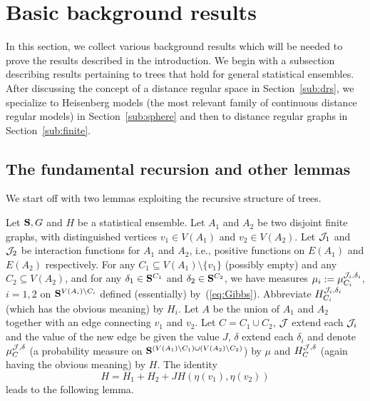 \setcounter{equation}{0}

\section{Basic background results} \label{sec:prelims}
In this section, we collect various background results which
will be needed to prove the results described in the introduction.
We begin with a subsection describing results pertaining to trees that 
hold for general statistical ensembles. 
After discussing the concept of a distance
regular space in Section~\ref{sub:drs}, we specialize 
to Heisenberg models (the most relevant family of continuous distance 
regular models) in Section~\ref{sub:sphere}
and then to distance regular graphs in Section~\ref{sub:finite}.  

\subsection{The fundamental recursion and other lemmas} \label{sub:rec}

We start off with two lemmas exploiting the recursive structure
of trees.

Let $\S,G$ and $H$ be a statistical ensemble.
Let $A_1$ and $A_2$ be two disjoint finite graphs, with distinguished 
vertices $v_1 \in V(A_1)$ and $v_2 \in V(A_2)$.  Let $\J_1$ and $\J_2$ 
be interaction functions for $A_1$ and $A_2$,
i.e., positive functions on $E(A_1)$ 
and $E(A_2)$ respectively.  For any $C_1 \subseteq V(A_1) \setminus 
\{ v_1 \}$ (possibly empty) and any $C_2 \subseteq V(A_2)$, and for any 
$\delta_1 \in \S^{C_1}$ and $\delta_2 \in \S^{C_2}$, 
we have measures $\mu_i := \mu^{\J_i , \delta_i}_{C_i}$, $i = 1, 2$
on $\S^{V(A_i)\setminus C_i}$ defined (essentially) by~(\ref{eq:Gibbs}). 
Abbreviate $H_{C_i}^{\J_i,\p_i}$ (which has the obvious meaning) by $H_i$.
Let $A$ be the union of $A_1$
and $A_2$ together with an edge connecting $v_1$ and $v_2$.  Let
$C = C_1 \cup C_2$, $\J$ extend each $\J_i$ and the value of the
new edge be given the value $J$, $\delta$
extend each $\delta_i$ and denote $\mu^{\J , \delta}_C$ 
(a probability measure on
$\S^{(V(A_1)\setminus C_1)\cup (V(A_2)\setminus C_2)}$)
by $\mu$ and $H^{\J , \delta}_C$ (again having the obvious meaning) by $H$.
The identity \begin{equation} \label{eq:Hdecomp}
H = H_1 + H_2 + J H (\eta (v_1) , \eta (v_2))
\end{equation}
leads to the following lemma.

